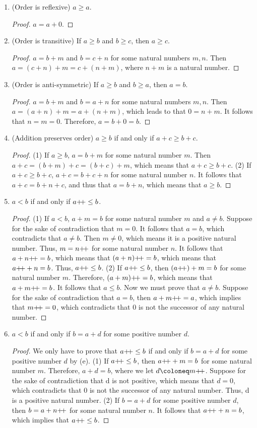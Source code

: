 \begin{enumerate}
    \item (Order is reflexive) $a \geq a$.
\begin{proof}
    $a=a+0$.
\end{proof}
    \item (Order is transitive) If $a\geq b$ and $b\geq c$, then $a \geq c$.
\begin{proof}
    $a=b+m$ and $b=c+n$ for some natural numbers $m,n$. Then $a=(c+n)+m=c+(n+m)$, where $n+m$ is a natural number.
\end{proof}
    \item (Order is anti-symmetric) If $a \geq b$ and $b \geq a$, then $a = b$.
\begin{proof}
    $a=b+m$ and $b=a+n$ for some natural numbers $m,n$. Then $a=(a+n)+m=a+(n+m)$, which leads to that $0=n+m$. It follows that $n=m=0$. Therefore, $a=b+0=b$.
\end{proof}
    \item (Addition preserves order) $a\geq b$ if and only if $a+c\geq b+c$.
\begin{proof}
    (1) If $a\geq b$, $a=b+m$ for some natural number $m$. Then $a+c=(b+m)+c=(b+c)+m$, which means that $a+c\geq b+c$. (2) If $a+c\geq b+c$, $a+c = b+c + n$ for some natural number $n$. It follows that $a+c=b+n+c$, and thus that $a=b+n$, which means that $a\geq b$.
\end{proof}
    \item $a<b$ if and only if $a{+}{\mkern-4mu}{+} \leq b$.
\begin{proof}
    (1) If $a<b$, $a+m=b$ for some natural number $m$ and $a\neq b$. Suppose for the sake of contradiction that $m=0$. It follows that $a=b$, which contradicts that $a\neq b$. Then $m\neq 0$, which means it is a positive natural number. Thus, $m=n{+}{\mkern-4mu}{+}$ for some natural number $n$. It follows that $a+n{+}{\mkern-4mu}{+}=b$, which means that $(a+n){+}{\mkern-4mu}{+}=b$, which means that $a{+}{\mkern-4mu}{+} + n = b$. Thus, $a{+}{\mkern-4mu}{+} \leq b$.
    (2) If $a{+}{\mkern-4mu}{+} \leq b$, then $(a{+}{\mkern-4mu}{+})+m=b$ for some natural number $m$. Therefore, $(a+m){+}{\mkern-4mu}{+}=b$, which means that $a+m{+}{\mkern-4mu}{+}=b$. It follows that $a\leq b$. Now we must prove that $a \neq b$. Suppose for the sake of contradiction that $a=b$, then $a+m{+}{\mkern-4mu}{+}=a$, which implies that $m{+}{\mkern-4mu}{+}=0$, which contradicts that $0$ is not the successor of any natural number.
\end{proof}
    \item $a<b$ if and only if $b=a+d$ for some positive number $d$.
\begin{proof}
    We only have to prove that $a{+}{\mkern-4mu}{+} \leq b$ if and only if $b=a+d$ for some positive number $d$ by (e).
    (1) If $a{+}{\mkern-4mu}{+} \leq b$, then $a{+}{\mkern-4mu}{+} + m = b$ for some natural number $m$. Therefore, $a + d = b$, where we let $d\coloneq m\inc$. Suppose for the sake of contradiction that d is not positive, which means that $d=0$, which contradicts that $0$ is not the successor of any natural number. Thus, d is a positive natural number.
    (2) If $b=a+d$ for some positive number $d$, then $b=a+n{+}{\mkern-4mu}{+}$ for some natural number $n$. It follows that $a{+}{\mkern-4mu}{+} + n =b$, which implies that $a{+}{\mkern-4mu}{+} \leq b$.
\end{proof}
\end{enumerate}

